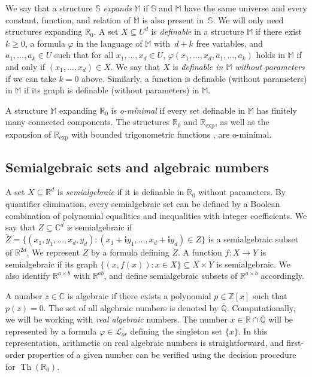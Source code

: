 \documentclass[a4paper,UKenglish,cleveref]{lipics-v2021}
\newcommand{\intg}{\mathbb{Z}}
\newcommand{\rel}{\mathbb{R}}
\newcommand{\rat}{\mathbb{Q}}
\newcommand{\com}{\mathbb{C}}
\newcommand{\alg}{\overline{\rat}}
\newcommand{\ralg}{\rel \cap \alg}
\newcommand{\rexp}{\rel_{\exp}}
\newcommand{\Lcal}{\mathcal{L}}
\newcommand{\Mb}{\mathbb{M}}
\newcommand{\Sb}{\mathbb{S}}
\newcommand{\im}{\bm{i}}
\begin{document}
We say that a structure $\Sb$ \emph{expands} $\Mb$ if $\Sb$ and $\Mb$ have the same universe and every constant, function, and relation of $\Mb$ is also present in~$\Sb$.
We will only need structures expanding $\rel_0$.
A set $X \subseteq U^d$ is \emph{definable} in a structure $\mathbb{M}$ if there exist $k \ge 0$, a formula $\varphi$ in the language of $\mathbb{M}$ with~$d+k$ free variables, and $a_1,\ldots,a_k \in U$ such that for all $x_1,\ldots,x_d \in U$, $\varphi(x_1,\ldots,x_d, a_1,\ldots,a_k)$ holds in $\Mb$ if and only if $(x_1,\ldots,x_d) \in X$.
We say that $X$ is \emph{definable in $\Mb$ without parameters} if we can take $k = 0$ above.
Similarly, a function is definable (without parameters) in $\Mb$ if its graph is definable (without parameters) in $\Mb$.

A structure $\Mb$ expanding $\rel_0$ is \emph{o-minimal} if every set definable in $\Mb$ has finitely many connected components.
The structures $\rel_0$ and $\rexp$,  as well as the expansion of $\rexp$ with bounded trigonometric functions \cite{vdD1994bounded-analytic}, are o-minimal.


\subsection{Semialgebraic sets and algebraic numbers}
\label{sec:semialgebraic-sets}
A set $X \subseteq \rel^d$ is \emph{semialgebraic} if it is definable in $\rel_0$ without parameters.
By quantifier elimination, every semialgebraic set can be defined by a Boolean combination of polynomial equalities and inequalities with integer coefficients.
We say that $Z \subseteq \com^d$ is semialgebraic if $\widetilde{Z} = \{(x_1,y_1,\ldots,x_d,y_d) \colon (x_1+\im y_1,\ldots,x_d + \im y_d) \in Z\}$ is a semialgebraic subset of $\rel^{2d}$.
We represent $Z$ by a formula defining $\tilde{Z}$.
A function $f \colon X \to Y$  is semialgebraic if its graph $\{(x, f(x)) \colon x \in X\} \subseteq X \times Y$ is semialgebraic.
We also identify $\rel^{a\times b}$ with $\rel^{ab}$, and define semialgebraic subsets of $\rel^{a\times b}$ accordingly.

A number $z \in \com$ is algebraic if there exists a polynomial $p \in \intg[x]$ such that $p(z) = 0$.
The set of all algebraic numbers is denoted by $\alg$.
Computationally, we will be working with \emph{real algebraic} numbers.
The number $x \in \ralg$ will be represented by a formula $\varphi \in \Lcal_{or}$ defining the singleton set $\{x\}$.
In this representation, arithmetic on real algebraic numbers is straightforward, and first-order properties of a given number can be verified using the decision procedure for $\operatorname{Th}(\rel_0)$. 
\end{document}
